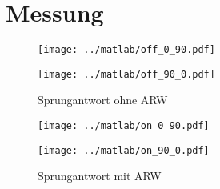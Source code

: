 \documentclass[a4,paper,fleqn]{article}
\begin{document}
\section{Messung}
\begin{figure}[h!]
    \begin{minipage}{0.45\textwidth}
        \centering
        \texttt{[image: ../matlab/off\_0\_90.pdf]}
        \label{fig:off_0_90}
    \end{minipage}
    \begin{minipage}{0.45\textwidth}
        \centering
        \texttt{[image: ../matlab/off\_90\_0.pdf]}
        \label{fig:off_0_90}
    \end{minipage}
    \caption{Sprungantwort ohne ARW}
    \label{fig:off}
\end{figure}
\begin{figure}[h!]
    \begin{minipage}{0.45\textwidth}
        \centering
        \texttt{[image: ../matlab/on\_0\_90.pdf]}
        \label{fig:on_0_90}
    \end{minipage}
    \begin{minipage}{0.45\textwidth}
        \centering
        \texttt{[image: ../matlab/on\_90\_0.pdf]}
        \label{fig:on_0_90}
    \end{minipage}
    \caption{Sprungantwort mit ARW}
    \label{fig:on}
\end{figure}
\end{document}
